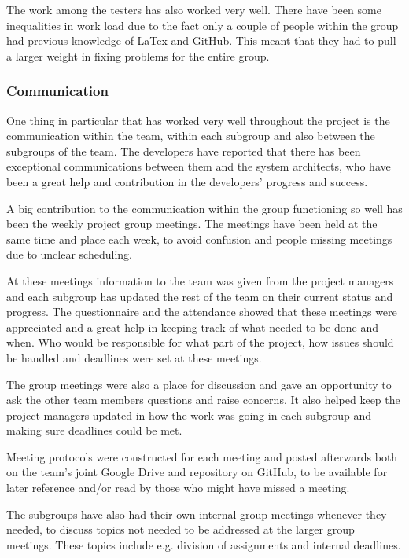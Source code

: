 \documentclass[a4paper]{article}
\begin{document}
The work among the testers has also worked very well. There have been some inequalities in work load due to the fact only a couple of people within the group had previous knowledge of LaTex and GitHub. This meant that they had to pull a larger weight in fixing problems for the entire group.




\subsubsection{Communication}
One thing in particular that has worked very well throughout the project is the communication within the team, within each subgroup and also between the subgroups of the team. The developers have reported that there has been exceptional communications between them and the system architects, who have been a great help and contribution in the developers' progress and success.

A big contribution to the communication within the group functioning so well has been the weekly project group meetings. The meetings have been held at the same time and place each week, to avoid confusion and people missing meetings due to unclear scheduling. 

At these meetings information to the team was given from the project managers and each subgroup has updated the rest of the team on their current status and progress. The questionnaire and the attendance showed that these meetings were appreciated and a great help in keeping track of what needed to be done and when. Who would be responsible for what part of the project, how issues should be handled and deadlines were set at these meetings.

The group meetings were also a place for discussion and gave an opportunity to ask the other team members questions and raise concerns. It also helped keep the project managers updated in how the work was going in each subgroup and making sure deadlines could be met.

Meeting protocols were constructed for each meeting and posted afterwards both on the team's joint Google Drive and repository on GitHub, to be available for later reference and/or read by those who might have missed a meeting.

The subgroups have also had their own internal group meetings whenever they needed, to discuss topics not needed to be addressed at the larger group meetings. These topics include e.g. division of assignments and internal deadlines.
\end{document}

